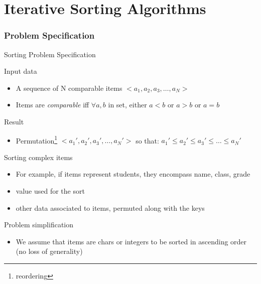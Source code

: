 \part{Iterative Sorting Algorithms}
\label{sort}\toc
\section{Problem Specification}
\begin{frame}[squeeze]{Sorting Problem Specification}
  \begin{block}{Input data}
    \begin{itemize}
    \item A sequence of N comparable items $<a_1,a_2,a_3,\ldots,a_N>$
    \item Items are \textit{comparable} iff $\forall a, b$ in set,
      either \underline{$a<b$} or \underline{$a>b$} or \underline{$a=b$}
    \end{itemize}
  \end{block}\vspace{-.7\baselineskip}

  \begin{block}{Result}
    \begin{itemize}
    \item Permutation\footnote{reordering} $<a_1',a_2',a_3',\ldots,a_N'>$ so
      that: $a_1'\leq a_2'\leq a_3'\leq\ldots\leq a_N'$
    \end{itemize}
  \end{block}\vspace{-.7\baselineskip}

  \begin{block}{Sorting complex items}
    \begin{itemize}
    \item For example, if items represent students, they encompass name, class,
      grade
    \item {} value used for the sort 
    \item {} other data associated to items, permuted
      along with the keys
    \end{itemize}
  \end{block}\vspace{-.7\baselineskip}

  \begin{block}{Problem simplification}
    \begin{itemize}
    \item We assume that items are chars or integers to be sorted in
      ascending order\\ (no loss of generality)
    \end{itemize}
  \end{block}\vspace{-.7\baselineskip}


\end{frame}
